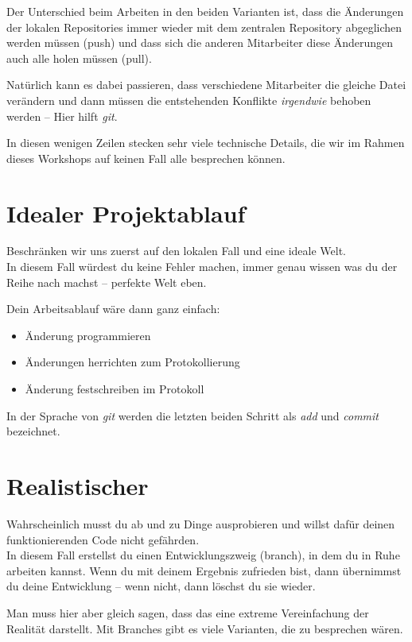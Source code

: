 \documentclass[
  letterpaper,
  DIV=11]{scrreprt}
\providecommand{\tightlist}{%
  \setlength{\itemsep}{0pt}\setlength{\parskip}{0pt}}\usepackage{longtable,booktabs,array}
\newcommand{\git}{\textit{git}\xspace}
\begin{document}
Der Unterschied beim Arbeiten in den beiden Varianten ist, dass die
Änderungen der lokalen Repositories immer wieder mit dem zentralen
Repository abgeglichen werden müssen (push) und dass sich die anderen
Mitarbeiter diese Änderungen auch alle holen müssen (pull).

Natürlich kann es dabei passieren, dass verschiedene Mitarbeiter die
gleiche Datei verändern und dann müssen die entstehenden Konflikte
\emph{irgendwie} behoben werden -- Hier hilft \git.

In diesen wenigen Zeilen stecken sehr viele technische Details, die wir
im Rahmen dieses Workshops auf keinen Fall alle besprechen können.

\section{Idealer Projektablauf}\label{idealer-projektablauf}

Beschränken wir uns zuerst auf den lokalen Fall und eine ideale Welt.\\
In diesem Fall würdest du keine Fehler machen, immer genau wissen was du
der Reihe nach machst -- perfekte Welt eben.

Dein Arbeitsablauf wäre dann ganz einfach:

\begin{itemize}
\tightlist
\item
  Änderung programmieren
\item
  Änderungen herrichten zum Protokollierung
\item
  Änderung festschreiben im Protokoll
\end{itemize}

In der Sprache von \git werden die letzten beiden Schritt als \emph{add}
und \emph{commit} bezeichnet.

\section{Realistischer}\label{realistischer}

Wahrscheinlich musst du ab und zu Dinge ausprobieren und willst dafür
deinen funktionierenden Code nicht gefährden.\\
In diesem Fall erstellst du einen Entwicklungszweig (branch), in dem du
in Ruhe arbeiten kannst. Wenn du mit deinem Ergebnis zufrieden bist,
dann übernimmst du deine Entwicklung -- wenn nicht, dann löschst du sie
wieder.

Man muss hier aber gleich sagen, dass das eine extreme Vereinfachung der
Realität darstellt. Mit Branches gibt es viele Varianten, die zu
besprechen wären.
\end{document}
